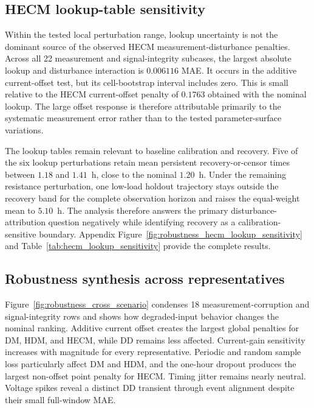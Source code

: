 \subsection{HECM lookup-table sensitivity}

Within the tested local perturbation range, lookup uncertainty is not the dominant source of the observed HECM measurement-disturbance penalties. Across all 22 measurement and signal-integrity subcases, the largest absolute lookup and disturbance interaction is $0.006116$ MAE. It occurs in the additive current-offset test, but its cell-bootstrap interval includes zero. This is small relative to the HECM current-offset penalty of $0.1763$ obtained with the nominal lookup. The large offset response is therefore attributable primarily to the systematic measurement error rather than to the tested parameter-surface variations.

The lookup tables remain relevant to baseline calibration and recovery. Five of the six lookup perturbations retain mean persistent recovery-or-censor times between $1.18$ and $1.41$~h, close to the nominal $1.20$~h. Under the remaining resistance perturbation, one low-load holdout trajectory stays outside the recovery band for the complete observation horizon and raises the equal-weight mean to $5.10$~h. The analysis therefore answers the primary disturbance-attribution question negatively while identifying recovery as a calibration-sensitive boundary. Appendix Figure~\ref{fig:robustness_hecm_lookup_sensitivity} and Table~\ref{tab:hecm_lookup_sensitivity} provide the complete results.

\subsection{Robustness synthesis across representatives}

Figure~\ref{fig:robustness_cross_scenario} condenses 18 measurement-corruption and signal-integrity rows and shows how degraded-input behavior changes the nominal ranking. Additive current offset creates the largest global penalties for DM, HDM, and HECM, while DD remains less affected. Current-gain sensitivity increases with magnitude for every representative. Periodic and random sample loss particularly affect DM and HDM, and the one-hour dropout produces the largest non-offset point penalty for HECM. Timing jitter remains nearly neutral. Voltage spikes reveal a distinct DD transient through event alignment despite their small full-window MAE.

